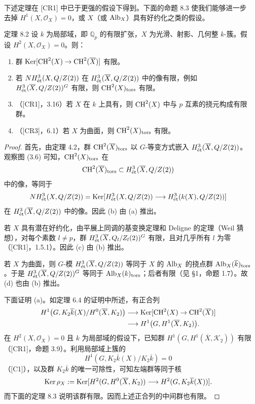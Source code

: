 下述定理在 [CR1] 中已于更强的假设下得到。下面的命题 8.3 使我们能够进一步去掉 $H^1(X,\mathcal O_X)=0$，或 $X$（或 $\operatorname{Alb}_X$）具有好约化之类的假设。
\begin{statement}{定理 8.2}
设 $k$ 为局部域，即 $\mathbb Q_p$ 的有限扩张，$X$ 为光滑、射影、几何整 $k$-簇。假设 $H^2(X,\mathcal O_X)=0$。则：
\begin{enumerate}[label=(\alph*)]
\item 群 $\operatorname{Ker}[\operatorname{CH}^2(X)\to\operatorname{CH}^2(\overline X)]$ 有限。
\item 若 $NH^3_{\mathrm{\acute et}}(X,Q/Z(2))$ 在 $H^3_{\mathrm{\acute et}}(\overline X,Q/Z(2))$ 中的像有限，例如 $H^3_{\mathrm{\acute et}}(\overline X,Q/Z(2))^G$ 有限，则 $\operatorname{CH}^2(X)_{\mathrm{tors}}$ 有限。
\item （[CR1]，3.16）若 $X$ 在 $k$ 上具有，则 $\operatorname{CH}^2(X)$ 中与 $p$ 互素的挠元构成有限群。
\item （[CR3]，6.1）若 $X$ 为曲面，则 $\operatorname{CH}^2(X)_{\mathrm{tors}}$ 有限。
\end{enumerate}
\end{statement}
\begin{proof}
首先，由定理 4.2，群 $\operatorname{CH}^2(\overline X)_{\mathrm{tors}}$ 以 $G$-等变方式嵌入 $H^3_{\mathrm{\acute et}}(\overline X,Q/Z(2))$。观察图 (3.6) 可知，$\operatorname{CH}^2(X)_{\mathrm{tors}}$ 在
\[
 \operatorname{CH}^2(\overline X)_{\mathrm{tors}}\subset H^3_{\mathrm{\acute et}}(\overline X,Q/Z(2))
\]
中的像，等同于
\[
 NH^3_{\mathrm{\acute et}}(X,Q/Z(2))
 =\operatorname{Ker}[H^3_{\mathrm{\acute et}}(X,Q/Z(2))
 \longrightarrow H^3_{\mathrm{\acute et}}(k(X),Q/Z(2))]
\]
在 $H^3_{\mathrm{\acute et}}(\overline X,Q/Z(2))$ 中的像。因此 (b) 由 (a) 推出。

若 $X$ 具有潜在好约化，由平展上同调的基变换定理和 Deligne 的定理（Weil 猜想），对每个素数 $l\ne p$，群 $H^3_{\mathrm{\acute et}}(\overline X,Q_l/Z_l(2))^G$ 有限，且对几乎所有 $l$ 为零（[CR1]，1.5.1）。因此 (c) 由 (b) 推出。

若 $X$ 为曲面，则 $G$-模 $H^3_{\mathrm{\acute et}}(\overline X,Q/Z(2))$ 等同于 $X$ 的 $\operatorname{Alb}_X$ 的挠点群 $\operatorname{Alb}_X(\overline k)_{\mathrm{tors}}$。于是 $H^3_{\mathrm{\acute et}}(\overline X,Q/Z(2))^G$ 等同于 $\operatorname{Alb}_X(k)_{\mathrm{tors}}$；后者有限（见 §1，命题 1.7）。故 (d) 也由 (b) 推出。

下面证明 (a)。如定理 6.4 的证明中所述，有正合列
\[
\begin{split}
 H^1\bigl(G,K_2\overline k(X)/H^0(\overline X,K_2)\bigr)
 &\longrightarrow\operatorname{Ker}[\operatorname{CH}^2(X)\to\operatorname{CH}^2(\overline X)]\\
 &\longrightarrow H^1\bigl(G,H^1(\overline X,K_2)\bigr).
\end{split}
\]
在 $H^2(X,\mathcal O_X)=0$ 且 $k$ 为局部域的假设下，已知群 $H^1(G,H^1(\overline X,\mathcal K_2))$ 有限（[CR1]，命题 3.9）。利用局部域上簇的
\[
 H^1(G,K_2\overline k(X)/K_2\overline k)=0
\]
（[C1]），以及群 $K_2\overline k$ 的唯一可除性，可知左端群等同于核
\[
 \operatorname{Ker}\rho_X:=\operatorname{Ker}[H^2(G,H^0(\overline X,K_2))
 \longrightarrow H^2(G,K_2\overline k(X))].
\]
而下面的定理 8.3 说明该群有限。因而上述正合列的中间群也有限。
\end{proof}

